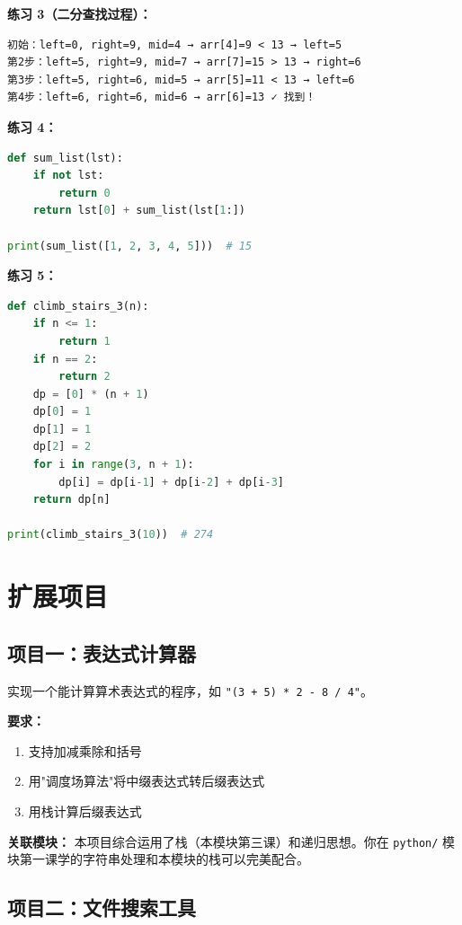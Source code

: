 \documentclass[a4paper,12pt]{ctexart}
\begin{document}
\textbf{练习 3（二分查找过程）：}
\begin{verbatim}
初始：left=0, right=9, mid=4 → arr[4]=9 < 13 → left=5
第2步：left=5, right=9, mid=7 → arr[7]=15 > 13 → right=6
第3步：left=5, right=6, mid=5 → arr[5]=11 < 13 → left=6
第4步：left=6, right=6, mid=6 → arr[6]=13 ✓ 找到！
\end{verbatim}

\textbf{练习 4：}
\begin{lstlisting}[language=Python]
def sum_list(lst):
    if not lst:
        return 0
    return lst[0] + sum_list(lst[1:])

print(sum_list([1, 2, 3, 4, 5]))  # 15
\end{lstlisting}

\textbf{练习 5：}
\begin{lstlisting}[language=Python]
def climb_stairs_3(n):
    if n <= 1:
        return 1
    if n == 2:
        return 2
    dp = [0] * (n + 1)
    dp[0] = 1
    dp[1] = 1
    dp[2] = 2
    for i in range(3, n + 1):
        dp[i] = dp[i-1] + dp[i-2] + dp[i-3]
    return dp[n]

print(climb_stairs_3(10))  # 274
\end{lstlisting}

\section*{扩展项目}

\subsection*{项目一：表达式计算器}

实现一个能计算算术表达式的程序，如 \texttt{"(3 + 5) * 2 - 8 / 4"}。

\textbf{要求：}
\begin{enumerate}
  \item 支持加减乘除和括号
  \item 用"调度场算法"将中缀表达式转后缀表达式
  \item 用栈计算后缀表达式
\end{enumerate}

\textbf{关联模块：} 本项目综合运用了栈（本模块第三课）和递归思想。你在 \texttt{python/} 模块第一课学的字符串处理和本模块的栈可以完美配合。

\subsection*{项目二：文件搜索工具}
\end{document}

